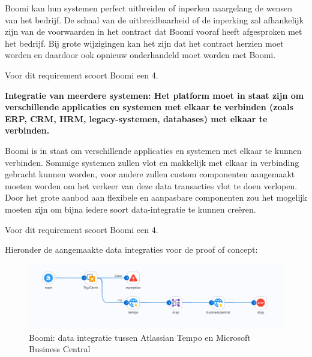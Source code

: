 \vspace{\baselineskip}

Boomi kan hun systemen perfect uitbreiden of inperken naargelang de wensen van het bedrijf. De schaal van de uitbreidbaarheid of de inperking zal afhankelijk zijn van de voorwaarden in het contract dat Boomi vooraf heeft afgesproken met het bedrijf. Bij grote wijzigingen kan het zijn dat het contract herzien moet worden en daardoor ook opnieuw onderhandeld moet worden met Boomi.

Voor dit requirement scoort Boomi een 4.


\vspace{\baselineskip}

\textbf{Integratie van meerdere systemen: Het platform moet in staat zijn om verschillende applicaties en systemen met elkaar te verbinden (zoals ERP, CRM, HRM, legacy-systemen, databases) met elkaar te verbinden.}

\vspace{\baselineskip}

Boomi is in staat om verschillende applicaties en systemen met elkaar te kunnen verbinden. Sommige systemen zullen vlot en makkelijk met elkaar in verbinding gebracht kunnen worden, voor andere zullen custom componenten aangemaakt moeten worden om het verkeer van deze data transacties vlot te doen verlopen. Door het grote aanbod aan flexibele en aanpasbare componenten zou het mogelijk moeten zijn om bijna iedere soort data-integratie te kunnen creëren.

Voor dit requirement scoort Boomi een 4.

\vspace{\baselineskip}

Hieronder de aangemaakte data integraties voor de proof of concept:

\begin{figure}[H]
    \centering
    \includegraphics[width=\textwidth,height=\textheight,keepaspectratio]{../bachproef/images/Boomi_AtlassianTime.png}
    \caption{Boomi: data integratie tussen Atlassian Tempo en Microsoft Business Central}
\end{figure}

